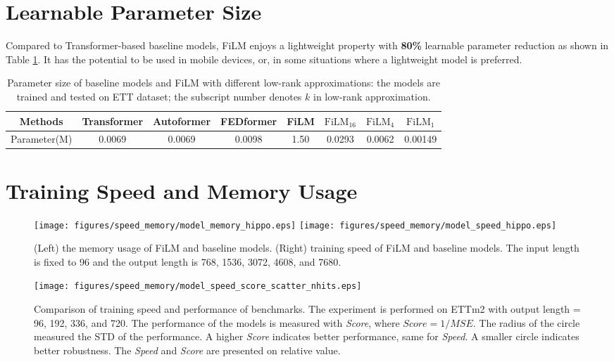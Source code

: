 \documentclass{article}
\begin{document}
  \section{Learnable Parameter Size}
\label{app:sec:learnable_para_size}

Compared to Transformer-based baseline models, FiLM enjoys a lightweight property with \textbf{80\%} learnable parameter reduction as shown in Table \ref{tab:size}. It has the potential to be used in mobile devices, or, in some situations where a lightweight model is preferred.

\begin{table}[h]
\centering
\caption{Parameter size of baseline models and FiLM with different low-rank approximations: the models are trained and tested on ETT dataset; the subscript number denotes $k$ in low-rank approximation.}
\begin{small}
\vskip 0.05in
\begin{tabular}{c|ccccccc}
\toprule
Methods&Transformer&Autoformer&FEDformer&FiLM&$\mathrm{FiLM}_{16}$ & $\mathrm{FiLM}_4$ & $\mathrm{FiLM}_1$\\
\midrule
Parameter(M) & 0.0069 & 0.0069& 0.0098& 1.50 & 0.0293 &0.0062& 0.00149 \\
\bottomrule
\end{tabular}
\label{tab:size}
\end{small}
\vskip -0.1in
\end{table}
 
 \section{Training Speed and Memory Usage}
\label{app:time}

\begin{figure*}[h]
    \centering
\texttt{[image: figures/speed\_memory/model\_memory\_hippo.eps]}
    \texttt{[image: figures/speed\_memory/model\_speed\_hippo.eps]}
\caption{(Left) the memory usage of FiLM and baseline models. (Right) training speed of FiLM and baseline models. The input length is fixed to 96 and the output length is 768, 1536, 3072, 4608, and 7680.}
    \label{fig:Mem_Time}
\end{figure*}

\begin{figure*}[h]
    \centering
\texttt{[image: figures/speed\_memory/model\_speed\_score\_scatter\_nhits.eps]}
\caption{Comparison of training speed and performance of benchmarks. The experiment is performed on ETTm2 with output length = 96, 192, 336, and 720. The performance of the models is measured with \textit{Score}, where $Score=1/MSE$. The radius of the circle measured the STD of the performance. A higher \textit{Score} indicates better performance, same for \textit{Speed}. A smaller circle indicates better robustness. The \textit{Speed} and \textit{Score} are presented on relative value.}
    \label{fig:Time_score_scatter}
\end{figure*}
\end{document}
